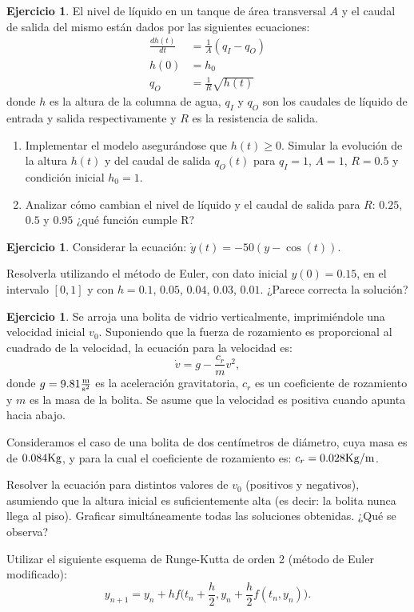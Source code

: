 \documentclass[12pt, a4paper]{amsbook}
\theoremstyle{remark}
\theoremstyle{definition}
\newtheorem{ejer}[teo]{Ejercicio}
\numberwithin{section}{chapter}
\numberwithin{subsection}{section}
\numberwithin{equation}{section}
\numberwithin{figure}{chapter}
\begin{document}
\begin{ejer} \label{tanque-agua} El nivel de líquido en un tanque de área transversal $A$ y el caudal de salida del mismo están dados por las siguientes ecuaciones:
\begin{align*}
  \frac{d h(t)}{d t} &= \frac{1}{A} \left( q_{I} - q_{O}\right)\\
  h(0) &= h_0\\
  q_{O} & = \frac{1}{R} \sqrt{h(t)}
\end{align*}
donde $h$ es la altura de la columna de agua, $q_I$ y $q_O$ son los caudales de líquido de entrada y salida respectivamente y $R$ es la resistencia de salida.
\begin{enumerate}
\item Implementar el modelo asegurándose que $h(t)\geq 0$. Simular la evolución de la altura $h(t)$ y del caudal de salida $q_O(t)$ para $q_I=1$, $A=1$, $R=0.5$ y condición inicial $h_0=1$.
\item Analizar cómo cambian el nivel de líquido y el caudal de salida para $R$: $0.25$, $0.5$ y $0.95$ ¿qué función cumple R?
\end{enumerate}
\end{ejer}



\begin{ejer} Considerar la ecuación: $\dot{y}(t) = -50(y-\cos(t)).$

Resolverla utilizando el método de Euler, con dato inicial $y(0)=0.15$, en el intervalo $[0,1]$ y con $h=0.1$, $0.05$, $0.04$, $0.03$, $0.01$. ¿Parece correcta la solución?
\end{ejer}

\begin{ejer} \label{bolita}
Se arroja una bolita de vidrio verticalmente, imprimiéndole una velocidad inicial $v_0$.
Suponiendo que la fuerza de rozamiento es proporcional al cuadrado de la velocidad, la ecuación para la velocidad es:
\[\dot{v} = g - \frac{c_r}{m}v^2,\]
donde $g=9.81\frac{{\rm m}}{{\rm s^2}}$ es la aceleración gravitatoria, $c_r$ es un coeficiente de rozamiento y $m$ es la masa de la bolita. Se asume que la velocidad es positiva cuando apunta hacia abajo. 

Consideramos el caso de una bolita de dos centímetros de diámetro, cuya masa es de $0.084 {\rm Kg}$, y para la cual el coeficiente de rozamiento es: $c_r=0.028 {\rm Kg}/{\rm m}$.

Resolver la ecuación para distintos valores de $v_0$ (positivos y negativos), asumiendo que la altura inicial es suficientemente alta (es decir: la bolita nunca llega al piso). Graficar simultáneamente todas las soluciones obtenidas. ¿Qué se observa?

Utilizar el siguiente esquema de Runge-Kutta de orden 2 (método de Euler modificado):
$$y_{n+1} = y_n + h f\Big(t_n+\frac{h}{2},y_n+\frac{h}{2}f(t_n,y_n)\Big).$$ 
\end{ejer}
\end{document}
